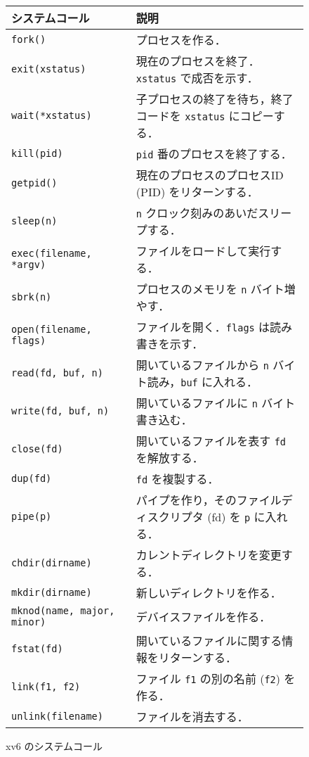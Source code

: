 \begin{figure}[t]
\center
{\footnotesize
\begin{tabular}{ll}
{\bf システムコール} & {\bf 説明} \\
\midrule
\texttt{fork()} & プロセスを作る．\\
\texttt{exit(xstatus)} & 現在のプロセスを終了．\texttt{xstatus} で成否を示す．\\
\texttt{wait(*xstatus)} & 子プロセスの終了を待ち，終了コードを \texttt{xstatus} にコピーする．\\
\texttt{kill(pid)} & \texttt{pid} 番のプロセスを終了する．\\
\texttt{getpid()} & 現在のプロセスのプロセスID (PID) をリターンする．\\
\texttt{sleep(n)} & \texttt{n} クロック刻みのあいだスリープする．\\
\texttt{exec(filename, *argv)} & ファイルをロードして実行する．\\
\texttt{sbrk(n)} & プロセスのメモリを \texttt{n} バイト増やす．\\
\texttt{open(filename, flags)} & ファイルを開く．\texttt{flags} は読み書きを示す．\\
\texttt{read(fd, buf, n)} & 開いているファイルから \texttt{n} バイト読み，\texttt{buf} に入れる．\\
\texttt{write(fd, buf, n)} & 開いているファイルに \texttt{n} バイト書き込む．\\
\texttt{close(fd)} & 開いているファイルを表す \texttt{fd} を解放する．\\
\texttt{dup(fd)} & \texttt{fd} を複製する．\\
\texttt{pipe(p)} & パイプを作り，そのファイルディスクリプタ (fd) を \texttt{p} に入れる．\\
\texttt{chdir(dirname)} & カレントディレクトリを変更する．\\
\texttt{mkdir(dirname)} & 新しいディレクトリを作る．\\
\texttt{mknod(name, major, minor)} & デバイスファイルを作る．\\
\texttt{fstat(fd)} & 開いているファイルに関する情報をリターンする．\\
\texttt{link(f1, f2) } & ファイル \texttt{f1} の別の名前 (\texttt{f2}) を作る．\\
\texttt{unlink(filename)} & ファイルを消去する．
\end{tabular}
}
\caption{xv6 のシステムコール}
\label{fig:api}
\end{figure}

